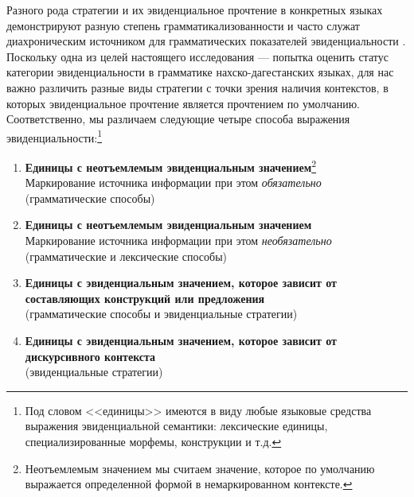 \color{purple} Разного рода стратегии и их эвиденциальное прочтение в конкретных языках демонстрируют разную степень грамматикализованности и часто служат диахроническим источником для грамматических показателей эвиденциальности \citep[267--280]{aikhenvald2004}. Поскольку одна из целей настоящего исследования --- попытка оценить статус категории эвиденциальности в грамматике нахско-дагестанских языках, для нас важно различить разные виды стратегии с точки зрения наличия контекстов, в которых эвиденциальное прочтение является прочтением по умолчанию. Соответственно, мы различаем следующие четыре способа выражения эвиденциальности:\footnote{Под словом <<единицы>> имеются в виду любые языковые средства выражения эвиденциальной семантики: лексические единицы, специализированные морфемы, конструкции и т.д.}

\begin{enumerate}
    \item \textbf{Единицы с неотъемлемым эвиденциальным значением}\footnote{Неотъемлемым значением мы считаем значение, которое по умолчанию выражается определенной формой в немаркированном контексте.}\\
    Маркирование источника информации при этом \textit{обязательно}\\
    (грамматические способы)
    \item \textbf{Единицы с неотъемлемым эвиденциальным значением}\\
    Маркирование источника информации при этом \textit{необязательно}\\
    (грамматические и лексические способы)
    \item \textbf{Единицы с эвиденциальным значением, которое зависит от составляющих конструкций или предложения}\\
    (грамматические способы и эвиденциальные стратегии)
    \item \textbf{Единицы с эвиденциальным значением, которое зависит от дискурсивного контекста}\\
    (эвиденциальные стратегии)
\end{enumerate}

